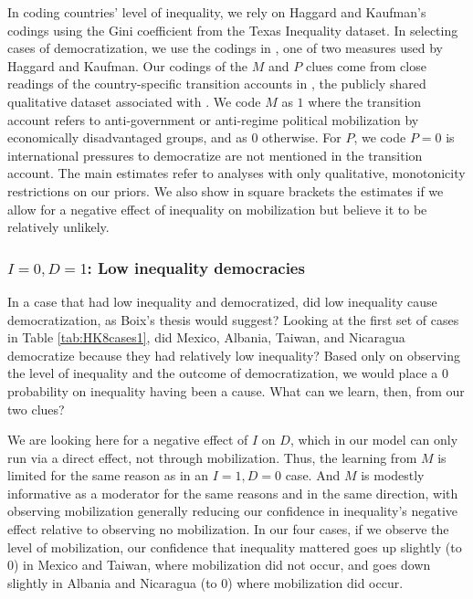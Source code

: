 \documentclass[
  12pt,
]{book}
\begin{document}
In coding countries' level of inequality, we rely on Haggard and Kaufman's codings using the Gini coefficient from the Texas Inequality dataset. In selecting cases of democratization, we use the codings in \citet{cheibub2010democracy}, one of two measures used by Haggard and Kaufman. Our codings of the \(M\) and \(P\) clues come from close readings of the country-specific transition accounts in \citet{haggard2012distributive}, the publicly shared qualitative dataset associated with \citet{haggard2012inequality}. We code \(M\) as \(1\) where the transition account refers to anti-government or anti-regime political mobilization by economically disadvantaged groups, and as \(0\) otherwise. For \(P\), we code \(P=0\) is international pressures to democratize are not mentioned in the transition account. The main estimates refer to analyses with only qualitative, monotonicity restrictions on our priors. We also show in square brackets the estimates if we allow for a negative effect of inequality on mobilization but believe it to be relatively unlikely.

\hypertarget{i0-d1-low-inequality-democracies}{%
\subsubsection{\texorpdfstring{\(I=0, D=1\): Low inequality democracies}{I=0, D=1: Low inequality democracies}}\label{i0-d1-low-inequality-democracies}}

In a case that had low inequality and democratized, did low inequality cause democratization, as Boix's thesis would suggest? Looking at the first set of cases in Table \ref{tab:HK8cases1}, did Mexico, Albania, Taiwan, and Nicaragua democratize because they had relatively low inequality? Based only on observing the level of inequality and the outcome of democratization, we would place a 0 probability on inequality having been a cause. What can we learn, then, from our two clues?

We are looking here for a negative effect of \(I\) on \(D\), which in our model can only run via a direct effect, not through mobilization. Thus, the learning from \(M\) is limited for the same reason as in an \(I=1, D=0\) case. And \(M\) is modestly informative as a moderator for the same reasons and in the same direction, with observing mobilization generally reducing our confidence in inequality's negative effect relative to observing no mobilization. In our four cases, if we observe the level of mobilization, our confidence that inequality mattered goes up slightly (to 0) in Mexico and Taiwan, where mobilization did not occur, and goes down slightly in Albania and Nicaragua (to 0) where mobilization did occur.
\end{document}
